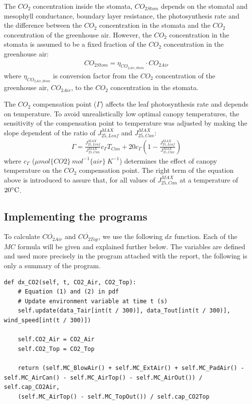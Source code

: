 \documentclass[a4paper]{article}
\numberwithin{equation}{section}
\begin{document}
The \( CO_2 \) concentration inside the stomata, \( CO_{2Stom} \) depends on the stomatal and mesophyll conductance, boundary layer resistance, the photosynthesis rate and the difference between the \( CO_2 \) concentration in the stomata and the \( CO_2 \) concentration of the greenhouse air. However, the \( CO_2 \) concentration in the stomata is assumed to be a fixed fraction of the \( CO_2 \) concentration in the greenhouse air:
\begin{align}
  CO_{2Stom} = \eta_{CO_{2Air\_Stom}} \cdot CO_{2Air}
\end{align}
where \( \eta_{CO_{2Air\_Stom}} \) is conversion factor from the \( CO_2 \) concentration of the greenhouse air, \( CO_{2Air} \), to the \( CO_2 \) concentration in the stomata.

The \( CO_2 \) compensation point (\( \Gamma \)) affects the leaf photosynthesis rate and depends on temperature. To avoid unrealistically low optimal canopy temperatures, the sensitivity of the compensation point to temperature was adjusted by making the slope dependent of the ratio of \( J^{MAX}_{25,Leaf} \) and \( J^{MAX}_{25,Can} \):
\begin{align}
  \Gamma = \frac{J^{MAX}_{25,Leaf}}{J^{MAX}_{25,Can}}c_{\Gamma} T_{Can} + 20 c_{\Gamma} \left(1-\frac{J^{MAX}_{25,Leaf}}{J^{MAX}_{25,Can}}\right)
\end{align}
where \( c_{\Gamma} \) (\( \mu mol\{CO2\}\ mol^{-1}\{air\}\ K^{-1} \)) determines the effect of canopy temperature on the \( CO_2 \) compensation point. The right term of the equation above is introduced to assure that, for all values of \( J^{MAX}_{25,Can} \) at a temperature of \( 20 \celsius \).

\newpage
\subsection{Implementing the programs}
To calculate \( \dot{CO_{2 Air}} \) and \( \dot{CO_{2 Top}} \), we use the following \( dx \) function. Each of the \( MC \) formula will be given and explained further below. The variables are defined and used more precisely in the program attached with the report, the following is only a summary of the program.

\begin{mdframed}[leftline=false,rightline=false,backgroundcolor=magenta!10,nobreak=true]
  \begin{verbatim}
def dx_CO2(self, t, CO2_Air, CO2_Top):
    # Equation (1) and (2) in pdf
    # Update environment variable at time t (s)
    self.update(data_Tair[int(t / 300)], data_Tout[int(t / 300)], wind_speed[int(t / 300)])

    self.CO2_Air = CO2_Air
    self.CO2_Top = CO2_Top

    return (self.MC_BlowAir() + self.MC_ExtAir() + self.MC_PadAir() - self.MC_AirCan() - self.MC_AirTop() - self.MC_AirOut()) / self.cap_CO2Air, 
    (self.MC_AirTop() - self.MC_TopOut()) / self.cap_CO2Top
  \end{verbatim}
\end{mdframed}
\end{document}
